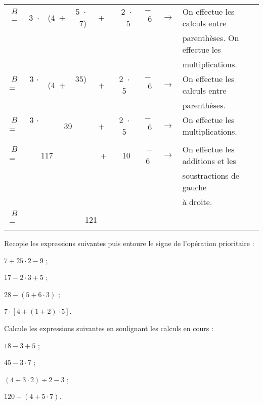 \begin{methode*1}
\begin{exemple*1}
\begin{center}
\begin{tabularx}{1.2\linewidth}{ccccccccX}
$B$=	 	& 3 $\cdot$	& (4 +	& 5 $\cdot$ 7)	& + & 2 $\cdot$  5	& $-$ 6	& $\rightarrow$ & On effectue les calculs entre \\ \cline{4-4}
&&&&&&&&  parenthèses. On effectue les\\
&&&&&&&& multiplications. \\
$B$= 	& 3 $\cdot$  	& (4 + 	&  35)  		&+ & 2 $\cdot$  5 	&$-$ 6  	& $\rightarrow$ & On effectue les calculs entre\\ \cline{3-4}
 &&&&&&&& parenthèses.\\
$B$= 	& 3 $\cdot$  	&    \multicolumn{2}{c}{39}      		     		& + & 2 $\cdot$  5 	&$-$ 6  	& $\rightarrow$ & On effectue les multiplications.\\ \cline{2-3}\cline{6-6}
 &&&&&&&& \\
$B$= 	&      		\multicolumn{2}{c}{117} &             			& +  & 10  			& $-$6  	& $\rightarrow$ & On effectue les additions et les \\ \cline{2-7}
 &&&&&&&& soustractions de gauche\\
 &&&&&&&& à droite.\\
$B$= 	&                \multicolumn{6}{c}{121}                             								&  & \\
\end{tabularx}
\end{center}
\end{exemple*1}

\exercice 
Recopie les expressions suivantes puis entoure le signe de l'opération prioritaire :
\begin{colenumerate}{2}
 \item $7 + 25 \cdot 2 - 9$ ;
 \item $17 - 2 \cdot 3 + 5$ ;
 \item $28 - (5 + 6 \cdot 3)$ ;
 \item $7 \cdot [4  + (1 + 2) \cdot 5]$.
 \end{colenumerate}
 
 \exercice 
Calcule les expressions suivantes en soulignant les calculs en cours :
\begin{colenumerate}{2}
 \item $18 - 3 + 5$ ;
 \item $45 - 3 \cdot 7$ ;
 \item $(4 + 3 \cdot 2) \div 2 - 3$ ;
 \item $120 - (4 + 5 \cdot 7)$.
 \end{colenumerate}


\end{methode*1}



